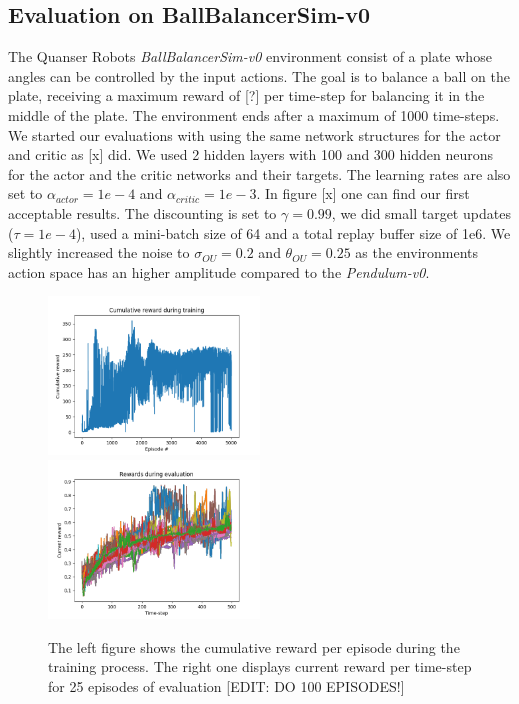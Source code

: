 \subsection{Evaluation on BallBalancerSim-v0}
The Quanser Robots \textit{BallBalancerSim-v0} environment consist of a plate whose angles can be controlled by the input actions. The goal is to balance a ball on the plate, receiving a maximum reward of [?] per time-step for balancing it in the middle of the plate. The environment ends after a maximum of 1000 time-steps.\\
We started our evaluations with using the same network structures for the actor and critic as [x] did. We used 2 hidden layers with 100 and 300 hidden neurons for the actor and the critic networks and their targets. The learning rates are also set to $\alpha_{actor}=1e-4$ and $\alpha_{critic}=1e-3$. 
In figure [x] one can find our first acceptable results. The discounting is set to $\gamma=0.99$, we did small target updates ($\tau=1e-4$), used a mini-batch size of 64 and a total replay buffer size of 1e6. We slightly increased the noise to $\sigma_{OU}=0.2$ and $\theta_{OU}=0.25$ as the environments action space has an higher amplitude compared to the \textit{Pendulum-v0}. 
\begin{figure}[H]
	\includegraphics[width=0.5\textwidth]{plots/ddpg_ball_first_train.png}
	\includegraphics[width=0.5\textwidth]{plots/ddpg_ball_first_eval.png}
	\caption{The left figure shows the cumulative reward per episode during the training process. The right one displays current reward per time-step for 25 episodes of evaluation [EDIT: DO 100 EPISODES!]}
	\label{ddpg:ball:first}
\end{figure}
